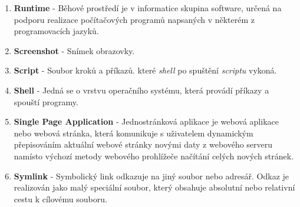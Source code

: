 \documentclass[12pt,a4paper]{report}
\begin{document}
\begin{enumerate}
    \item \textbf{Runtime} - Běhové prostředí je v informatice skupina software, určená na podporu realizace počítačových programů napsaných v některém z programovacích jazyků.
    \item \textbf{Screenshot} - Snímek obrazovky.
    \item \textbf{Script} - Soubor kroků a příkazů. které \emph{shell} po spuštění \emph{scriptu} vykoná.
    \item \textbf{Shell} - Jedná se o vrstvu operačního systému, která provádí příkazy a spouští programy.
    \item \textbf{Single Page Application} - Jednostránková aplikace je webová aplikace nebo webová stránka, která komunikuje s uživatelem dynamickým přepisováním aktuální webové stránky novými daty z webového serveru namísto výchozí metody webového prohlížeče načítání celých nových stránek.
    \item \textbf{Symlink} - Symbolický link odkazuje na jiný soubor nebo adresář. Odkaz je realizován jako malý speciální soubor, který obsahuje absolutní nebo relativní cestu k cílovému souboru.
  \end{enumerate}

  \clearpage
\end{document}
